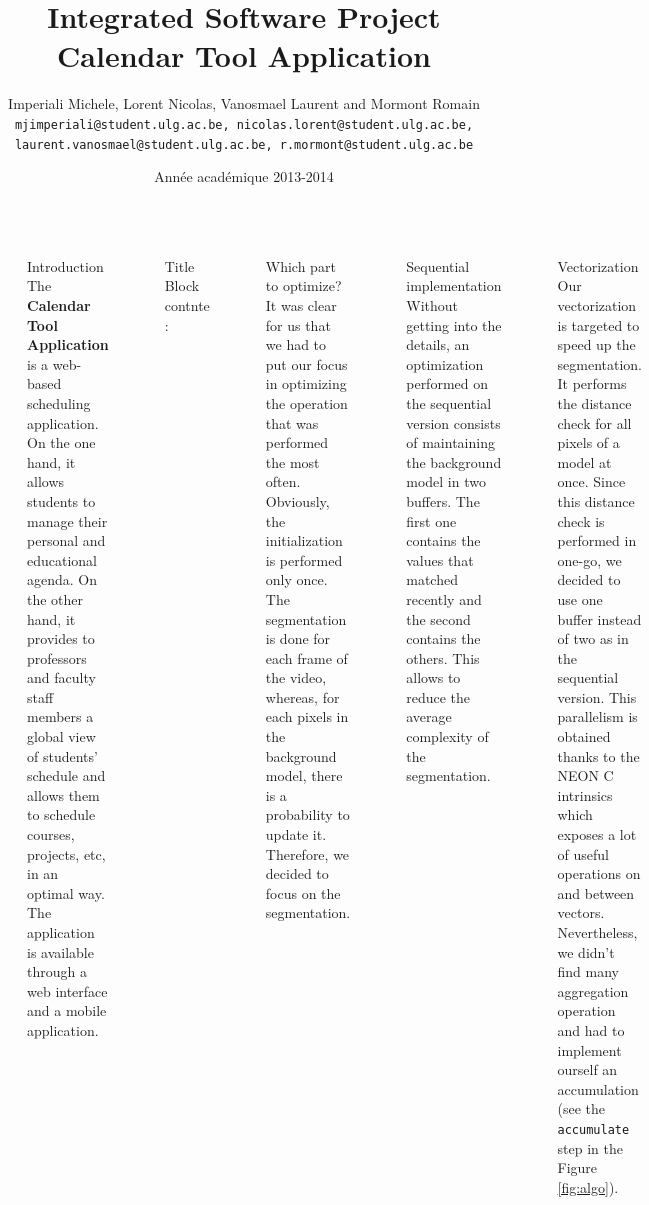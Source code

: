 \documentclass{beamer}
\title{Integrated Software Project \\ Calendar Tool Application}
\author{Imperiali Michele, Lorent Nicolas, Vanosmael Laurent and Mormont Romain\\
{\tt mjimperiali@student.ulg.ac.be, nicolas.lorent@student.ulg.ac.be, laurent.vanosmael@student.ulg.ac.be, r.mormont@student.ulg.ac.be}}
\institute{Faculty of Applied Sciences -- University of Liège -- Belgium}
\date{Année académique 2013-2014}
\begin{document}
\begin{columns}[t]

\column{.45\paperwidth}

 ~~ 
\begin{alertblock}{Introduction}
The \textbf{Calendar Tool Application} is a web-based scheduling application. On the one hand, it allows students to manage their personal and educational agenda. On the other hand, it provides to professors and faculty staff members a global view of students' schedule and allows them to schedule courses, projects, etc, in an optimal way.
The application is available through a web interface and a mobile application.
\end{alertblock}

~~ %

\begin{block}{Title}
Block contnte :

\end{block}

~~
\begin{block}{Which part to optimize?}
It was clear for us that we had to put our focus in optimizing the operation that was performed the most often.
Obviously, the initialization is performed only once. The segmentation is done for each frame of the video, whereas, for each pixels in the background model, there is a probability to update it. Therefore, we decided to focus on the segmentation. 
\end{block}

~~ 
\begin{block}{Sequential implementation}
Without getting into the details, an optimization performed on the sequential version consists of maintaining the background model in two buffers. The first one contains the values that matched recently and the second contains the others. This allows to reduce the average complexity of the segmentation.
\end{block}

~~
\begin{block}{Vectorization}
Our vectorization is targeted to speed up the segmentation. It performs the distance check for all pixels of a model at once. Since this distance check is performed in one-go, we decided to use one buffer instead of two as in the sequential version. This parallelism is obtained thanks to the NEON C intrinsics which exposes a lot of useful operations on and between vectors. Nevertheless, we didn't find many aggregation operation and had to implement ourself an accumulation (see the \texttt{accumulate} step in the Figure \ref{fig:algo}).


\end{block}
\end{columns}
\end{document}
